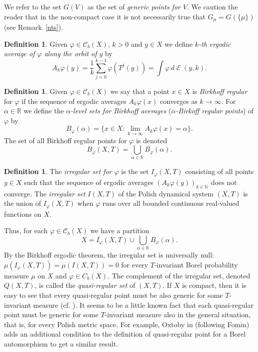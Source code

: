 \documentclass{amsart}
\theoremstyle{definition}
\newtheorem{defn}[thm]{Definition}
\newcommand{\cC}{\mathcal{C}}
\DeclareMathOperator{\Emp}{\mathcal{E}}%
\renewcommand{\phi}{\varphi}
\newcommand{\R}{\mathbb{R}}
\newcommand{\N}{\mathbb{N}}
\begin{document}
We refer to the set $G(V)$ as the set of \emph{generic
points for $V$}. We caution the reader that in the non-compact case
it is not necessarily true that $G_\mu=G(\{ \mu\})$ (see Remark~\ref{nts}).

\begin{defn}
Given $\phi\in\mathcal{C}_b(X)$, $k>0$ and $y\in X$ we define \emph{$k$-th ergodic average of $\phi$ along the orbit of $y$} by
\begin{equation}\label{eqn:Ak}
A_k\phi(y)=\frac{1}{k}\sum_{j=0}^{k-1} \phi(T^j(y))=\int \phi\, d \! \Emp(y,k).
\end{equation}
\end{defn}
\begin{defn}
Given $\phi\in\mathcal{C}_b(X)$
we say that a point $x\in X$ is \emph{Birkhoff regular} for $\phi$
if the sequence of ergodic averages $A_k\phi(x)$ converges as $k\to\infty$. For $\alpha\in\R$
we define the \emph{$\alpha$-level sets for Birkhoff averages} (\emph{$\alpha$-Birkoff regular points}) of $\phi$ by
\[
B_{\phi}(\alpha)=\{x\in X: \lim_{k\to\infty} A_k\phi(x)=\alpha\}.
\]
The set of all Birkhoff regular points for $\phi$ is denoted
\[
B_\phi(X,T)=\bigcup_{\alpha\in\R}B_\phi(\alpha).
\]
\end{defn}
\begin{defn}
The \emph{irregular set for $\phi$} is the set $I_\phi(X,T)$ consisting
of all points $y\in X$ such that the sequence of ergodic averages
$(A_k\phi(y))_{k\in\N}$ does not converge.
The \emph{irregular set} $I(X, T)$
of the Polish dynamical system $(X,T)$ is the union of $I_\phi(X,T)$
when $\phi$ runs over all bounded continuous real-valued functions on
$X$.
\end{defn}

Thus, for each $\phi\in\cC_b(X)$ we have a partition
\[
X=I_\phi(X,T)\cup \bigcup_{\alpha\in\R}B_\phi(\alpha).
\]
By the Birkhoff ergodic theorem,
the irregular set is
universally null:
$\mu(I_\phi(X,T))=\mu(I(X, T))=0$ for every
$T$-invariant Borel probability measure $\mu$ on $X$ and $\phi\in C_b(X)$.  The
complement of the irregular set, denoted $Q(X,T)$, is called the
\emph{quasi-regular set} of $(X,T)$.
If $X$ is compact, then it is easy to see that every quasi-regular point must be also generic for some $T$-invariant measure (cf. \cite{Oxtoby}).
It seems to be a little known fact that each quasi-regular point must be generic for some $T$-invariant measure also in the general situation, that is, for every Polish metric space.
For example, Oxtoby in \cite[Section 7]{Oxtoby} (following Fomin) adds an additional condition to the definition of quasi-regular point for a Borel automorphism to get a similar result.
\end{document}
